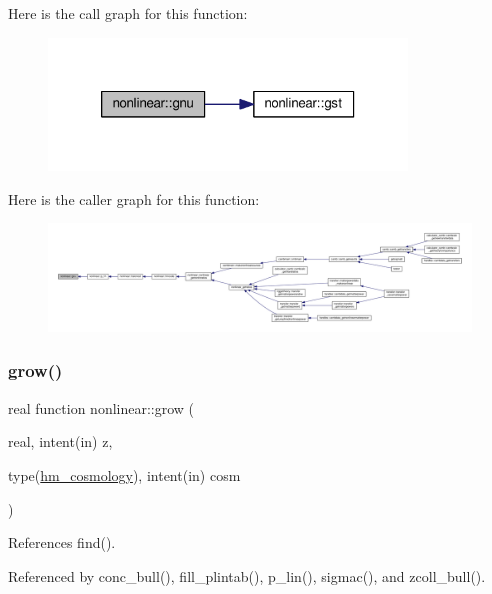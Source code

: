 Here is the call graph for this function\+:
\nopagebreak
\begin{figure}[H]
\begin{center}
\leavevmode
\includegraphics[width=270pt]{namespacenonlinear_a236c113538d97686a8f8e286b29bc073_cgraph}
\end{center}
\end{figure}
Here is the caller graph for this function\+:
\nopagebreak
\begin{figure}[H]
\begin{center}
\leavevmode
\includegraphics[width=350pt]{namespacenonlinear_a236c113538d97686a8f8e286b29bc073_icgraph}
\end{center}
\end{figure}
\mbox{\label{namespacenonlinear_a1870caf0d38a1c6617ca3ef8de2f6947}} 
\subsubsection{\texorpdfstring{grow()}{grow()}}
{\footnotesize\ttfamily real function nonlinear\+::grow (\begin{DoxyParamCaption}\item[{real, intent(in)}]{z,  }\item[{type(\mbox{\hyperlink{structnonlinear_1_1hm__cosmology}{hm\+\_\+cosmology}}), intent(in)}]{cosm }\end{DoxyParamCaption})\hspace{0.3cm}{\ttfamily [private]}}



References find().



Referenced by conc\+\_\+bull(), fill\+\_\+plintab(), p\+\_\+lin(), sigmac(), and zcoll\+\_\+bull().

